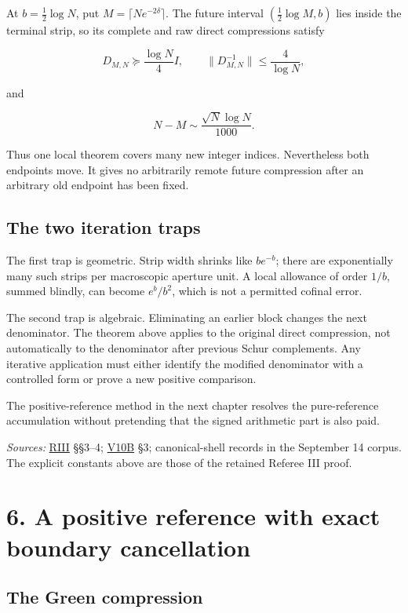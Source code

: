 \documentclass[
  10pt,
  a4paper,
  10pt,
  oneside,
  openany]{book}
\begin{document}
At \(b=\frac12\log N\), put \(M=\lceil Ne^{-2\delta}\rceil\). The future
interval \((\frac12\log M,b)\) lies inside the terminal strip, so its
complete and raw direct compressions satisfy

\[
D_{M,N}\succeq\frac{\log N}{4}I,
\qquad
\|D_{M,N}^{-1}\|\le\frac4{\log N},
\tag{5.13}\label{eq:5.13}
\]

and

\[
N-M\sim\frac{\sqrt N\log N}{1000}.
\tag{5.14}\label{eq:5.14}
\]

Thus one local theorem covers many new integer indices. Nevertheless
both endpoints move. It gives no arbitrarily remote future compression
after an arbitrary old endpoint has been fixed.

\subsection{The two iteration traps}\label{the-two-iteration-traps}

The first trap is geometric. Strip width shrinks like \(be^{-b}\); there
are exponentially many such strips per macroscopic aperture unit. A
local allowance of order \(1/b\), summed blindly, can become
\(e^b/b^2\), which is not a permitted cofinal error.

The second trap is algebraic. Eliminating an earlier block changes the
next denominator. The theorem above applies to the original direct
compression, not automatically to the denominator after previous Schur
complements. Any iterative application must either identify the modified
denominator with a controlled form or prove a new positive comparison.

The positive-reference method in the next chapter resolves the
pure-reference accumulation without pretending that the signed
arithmetic part is also paid.

\emph{Sources:} \hyperref[source-riii]{RIII} §§3--4;
\hyperref[source-v10b]{V10B} §3; canonical-shell records in the
September 14 corpus. The explicit constants above are those of the
retained Referee III proof.

\section{6. A positive reference with exact boundary
cancellation}\label{ch-reference}

\subsection{The Green compression}\label{the-green-compression}
\end{document}
